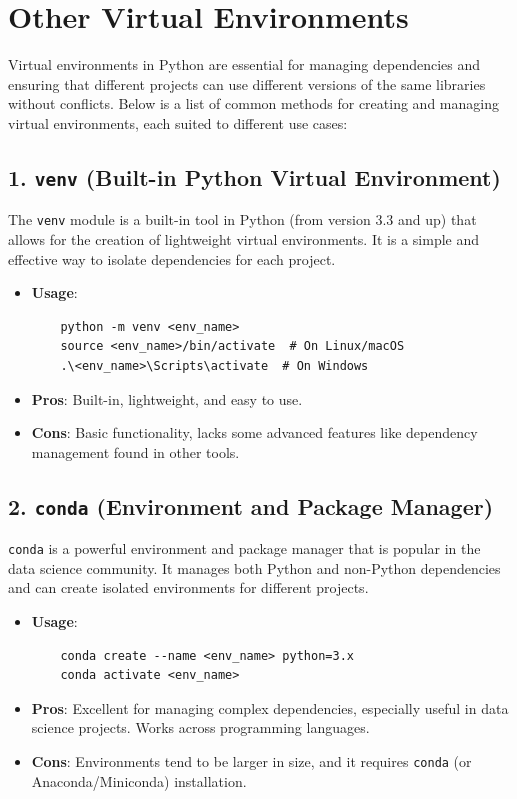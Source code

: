 \documentclass{article}
\begin{document}
\newpage

\appendix

\section{Other Virtual Environments}
\label{appendix-a}
Virtual environments in Python are essential for managing dependencies and ensuring that different projects can use different versions of the same libraries without conflicts. Below is a list of common methods for creating and managing virtual environments, each suited to different use cases:

\subsection{1. \texttt{venv} (Built-in Python Virtual Environment)}
The \texttt{venv} module is a built-in tool in Python (from version 3.3 and up) that allows for the creation of lightweight virtual environments. It is a simple and effective way to isolate dependencies for each project.

\begin{itemize}
    \item \textbf{Usage}: 
    \begin{verbatim}
    python -m venv <env_name>
    source <env_name>/bin/activate  # On Linux/macOS
    .\<env_name>\Scripts\activate  # On Windows
    \end{verbatim}
    \item \textbf{Pros}: Built-in, lightweight, and easy to use.
    \item \textbf{Cons}: Basic functionality, lacks some advanced features like dependency management found in other tools.
\end{itemize}

\subsection{2. \texttt{conda} (Environment and Package Manager)}
\texttt{conda} is a powerful environment and package manager that is popular in the data science community. It manages both Python and non-Python dependencies and can create isolated environments for different projects.

\begin{itemize}
    \item \textbf{Usage}: 
    \begin{verbatim}
    conda create --name <env_name> python=3.x
    conda activate <env_name>
    \end{verbatim}
    \item \textbf{Pros}: Excellent for managing complex dependencies, especially useful in data science projects. Works across programming languages.
    \item \textbf{Cons}: Environments tend to be larger in size, and it requires \texttt{conda} (or Anaconda/Miniconda) installation.
\end{itemize}
\end{document}
